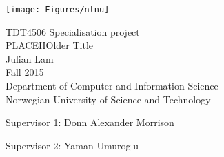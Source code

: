 \thispagestyle{empty}
\texttt{[image: Figures/ntnu]}
\mbox{}\\[6pc]
\begin{center}
\Large{TDT4506 Specialisation project}\\[1pc]
\Huge{PLACEHOlder Title}\\[2pc]

\Large{Julian Lam}\\[1pc]
\large{Fall 2015}\\[2pc]


Department of Computer and Information Science\\
Norwegian University of Science and Technology
\end{center}
\vfill

\noindent Supervisor 1: Donn Alexander Morrison

\noindent Supervisor 2: Yaman Umuroglu